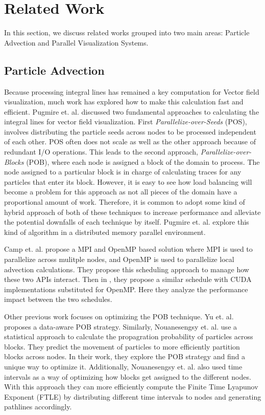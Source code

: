 \documentclass{IEEEtran}
\begin{document}
\section{Related Work}
In this section, we discuss related works grouped into two main areas: Particle Advection and Parallel Visualization Systems.

\subsection{Particle Advection}
Because processing integral lines has remained a key computation for Vector field visualization\cite{McLoughlin}, much work has explored how to make this calculation fast and efficient.
%
Pugmire et. al. discussed two fundamental approaches to calculating the integral lines for vector field visualization.\cite{Pugmire:SC09}
%
First \textit{Parallelize-over-Seeds} (POS), involves distributing the particle seeds across nodes to be processed independent of each other.
%
POS often does not scale as well as the other approach because of redundant I/O operations.
%
This leads to the second approach, \textit{Parallelize-over-Blocks} (POB), where each node is assigned a block of the domain to process.
%
The node assigned to a particular block is in charge of calculating traces for any particles that enter its block.
%
However, it is easy to see how load balancing will become a problem for this approach as not all pieces of the domain have a proportional amount of work.
%
Therefore, it is common to adopt some kind of hybrid approach of both of these techniques to increase performance and alleviate the potential downfalls of each technique by itself.
%
Pugmire et. al. \cite{Pugmire12} explore this kind of algorithm in a distributed memory parallel environment.

Camp et. al. \cite{Camp11} propose a MPI and OpenMP based solution where MPI is used to parallelize across mulitple nodes, and OpenMP is used to parallelize local advection calculations.
%
They propose this scheduling approach to manage how these two APIs interact.
%
Then in \cite{Camp13}, they propose a similar schedule with CUDA implementations substituted for OpenMP.
%
Here they analyze the performance impact between the two schedules.
%

Other previous work focuses on optimizing the POB technique.
%
Yu et. al. \cite{Yu07} proposes a data-aware POB strategy.
%
Similarly, Nouanesengsy et. al. \cite{Shen11} use a statistical approach to calculate the propagration probability of particles across blocks.
%
They predict the movement of particles to more efficiently partition blocks across nodes.
%
In their work, they explore the POB strategy and find a unique way to optimize it.
%
Additionally, Nouanesengsy et. al. \cite{Nouanesengsy:12} also used time intervals as a way of optimizing how blocks get assigned to the different nodes.
%
With this approach they can more efficiently compute the Finite Time Lyapunov Exponent (FTLE) by distributing different time intervals to nodes and generating pathlines accordingly.
%
\end{document}
